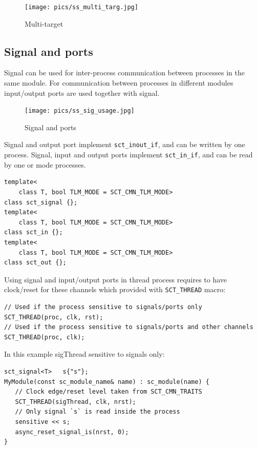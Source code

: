 \begin{figure}[!htb]
\centering
\texttt{[image: pics/ss\_multi\_targ.jpg]}
\caption{Multi-target}
\label{fig:ss_multi_targ}
\end{figure}

\fi

\subsection{Signal and ports}\label{section:sct_signal}
Signal can be used for inter-process communication between processes in the same module. For communication between processes in different modules input/output ports are used together with signal.

\begin{figure}[!htb]
\centering
\texttt{[image: pics/ss\_sig\_usage.jpg]}
\caption{Signal and ports}
\label{fig:ss_usage}
\end{figure}

Signal and output port implement {\tt sct\_inout\_if}, and can be written by one process. Signal, input and output ports implement {\tt sct\_in\_if}, and can be read by one or mode processes.

\begin{lstlisting}[style=mycpp]
template<
    class T, bool TLM_MODE = SCT_CMN_TLM_MODE>
class sct_signal {};
template<
    class T, bool TLM_MODE = SCT_CMN_TLM_MODE>
class sct_in {};
template<
    class T, bool TLM_MODE = SCT_CMN_TLM_MODE>
class sct_out {};
\end{lstlisting}

Using signal and input/output ports in thread process requires to have clock/reset for these channels which provided with {\tt SCT\_THREAD} macro:
\begin{lstlisting}[style=mycpp]
// Used if the process sensitive to signals/ports only  
SCT_THREAD(proc, clk, rst);  
// Used if the process sensitive to signals/ports and other channels
SCT_THREAD(proc, clk);       
\end{lstlisting}

In this example sigThread sensitive to signals only:
\begin{lstlisting}[style=mycpp]
sct_signal<T>   s{"s"};
MyModule(const sc_module_name& name) : sc_module(name) {  
   // Clock edge/reset level taken from SCT_CMN_TRAITS
   SCT_THREAD(sigThread, clk, nrst); 
   // Only signal `s` is read inside the process
   sensitive << s;                   
   async_reset_signal_is(nrst, 0);
}
\end{lstlisting}

